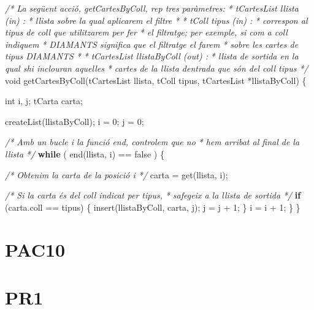 \documentclass[]{book}
\newenvironment{Shaded}{\begin{snugshade}}{\end{snugshade}}
\newcommand{\CommentTok}[1]{\textcolor[rgb]{0.56,0.35,0.01}{\textit{#1}}}
\newcommand{\ControlFlowTok}[1]{\textcolor[rgb]{0.13,0.29,0.53}{\textbf{#1}}}
\newcommand{\DataTypeTok}[1]{\textcolor[rgb]{0.13,0.29,0.53}{#1}}
\newcommand{\DecValTok}[1]{\textcolor[rgb]{0.00,0.00,0.81}{#1}}
\newcommand{\NormalTok}[1]{#1}
\begin{document}
\begin{Shaded}
\begin{Highlighting}[]
\CommentTok{/* La següent acció, getCartesByColl, rep tres paràmetres:}
\CommentTok{ * tCartesList llista (in) : }
\CommentTok{ * llista sobre la qual aplicarem el filtre}
\CommentTok{ * }
\CommentTok{ * tColl tipus (in) : }
\CommentTok{ * correspon al tipus de coll que utilitzarem per fer }
\CommentTok{ * el filtratge; per exemple, si com a coll indiquem }
\CommentTok{ * DIAMANTS significa que el filtratge el farem}
\CommentTok{ * sobre les cartes de tipus DIAMANTS}
\CommentTok{ *}
\CommentTok{ * tCartesList llistaByColl (out) :}
\CommentTok{ * llista de sortida en la qual s\textquotesingle{}hi inclouran aquelles}
\CommentTok{ * cartes de la llista d\textquotesingle{}entrada que són del coll tipus }
\CommentTok{ */}
\DataTypeTok{void}\NormalTok{ getCartesByColl(tCartesList llista, tColl tipus, tCartesList *llistaByColl) \{}

    \DataTypeTok{int}\NormalTok{ i, j;}
\NormalTok{    tCarta carta;}

\NormalTok{    createList(llistaByColl);}
\NormalTok{    i = }\DecValTok{0}\NormalTok{;}
\NormalTok{    j = }\DecValTok{0}\NormalTok{;}

    \CommentTok{/* Amb un bucle i la funció end, controlem que no }
\CommentTok{     * hem arribat al final de la llista }
\CommentTok{     */}
   \ControlFlowTok{while}\NormalTok{ ( end(llista, i) == false ) \{}

        \CommentTok{/* Obtenim la carta de la posició i */}
\NormalTok{        carta = get(llista, i);}

        \CommentTok{/* Si la carta és del coll indicat per tipus, }
\CommentTok{         * s\textquotesingle{}afegeix a la llista de sortida }
\CommentTok{         */}
        \ControlFlowTok{if}\NormalTok{ (carta.coll == tipus) \{}
\NormalTok{            insert(llistaByColl, carta, j);}
\NormalTok{            j = j + }\DecValTok{1}\NormalTok{;}
\NormalTok{        \}}
\NormalTok{        i = i + }\DecValTok{1}\NormalTok{;}
\NormalTok{    \}}
\NormalTok{\}}
\end{Highlighting}
\end{Shaded}

\hypertarget{pac10}{%
\chapter{PAC10}\label{pac10}}

\hypertarget{pr1}{%
\chapter{PR1}\label{pr1}}
\end{document}
